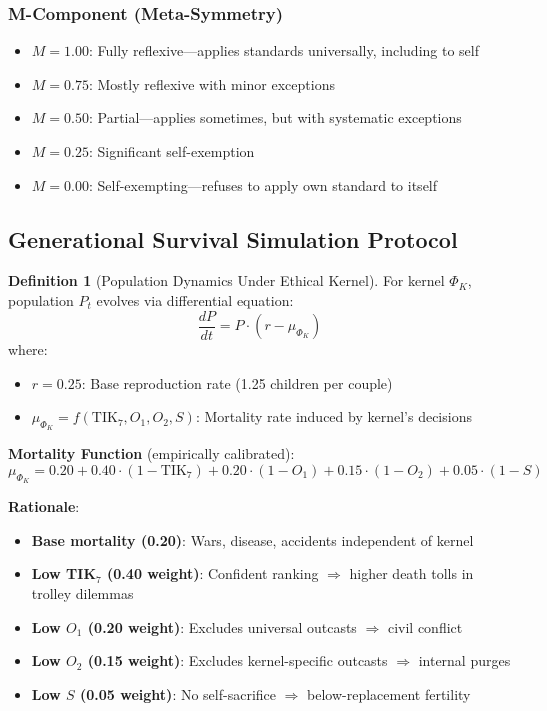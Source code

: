 \documentclass[11pt,a4paper]{article}
\theoremstyle{definition}
\newtheorem{definition}[theorem]{Definition}
\theoremstyle{remark}
\newcommand{\TIKseven}{\text{TIK}_7}
\begin{document}
\subsubsection{M-Component (Meta-Symmetry)}
\begin{itemize}
    \item $M = 1.00$: Fully reflexive---applies standards universally, including to self
    \item $M = 0.75$: Mostly reflexive with minor exceptions
    \item $M = 0.50$: Partial---applies sometimes, but with systematic exceptions
    \item $M = 0.25$: Significant self-exemption
    \item $M = 0.00$: Self-exempting---refuses to apply own standard to itself
\end{itemize}

\subsection{Generational Survival Simulation Protocol}

\begin{definition}[Population Dynamics Under Ethical Kernel]
\label{def:population-dynamics}
For kernel $\Phi_K$, population $P_t$ evolves via differential equation:
\begin{equation}
    \frac{dP}{dt} = P \cdot (r - \mu_{\Phi_K})
    \label{eq:population-ode}
\end{equation}
where:
\begin{itemize}
    \item $r = 0.25$: Base reproduction rate (1.25 children per couple)
    \item $\mu_{\Phi_K} = f(\TIKseven, O_1, O_2, S)$: Mortality rate induced by kernel's decisions
\end{itemize}
\end{definition}

\textbf{Mortality Function} (empirically calibrated):
\begin{equation}
    \mu_{\Phi_K} = 0.20 + 0.40 \cdot (1 - \TIKseven) + 0.20 \cdot (1 - O_1) + 0.15 \cdot (1 - O_2) + 0.05 \cdot (1 - S)
    \label{eq:mortality}
\end{equation}

\textbf{Rationale}:
\begin{itemize}
    \item \textbf{Base mortality (0.20)}: Wars, disease, accidents independent of kernel
    \item \textbf{Low TIK$_7$ (0.40 weight)}: Confident ranking $\Rightarrow$ higher death tolls in trolley dilemmas
    \item \textbf{Low $O_1$ (0.20 weight)}: Excludes universal outcasts $\Rightarrow$ civil conflict
    \item \textbf{Low $O_2$ (0.15 weight)}: Excludes kernel-specific outcasts $\Rightarrow$ internal purges
    \item \textbf{Low $S$ (0.05 weight)}: No self-sacrifice $\Rightarrow$ below-replacement fertility
\end{itemize}
\end{document}
